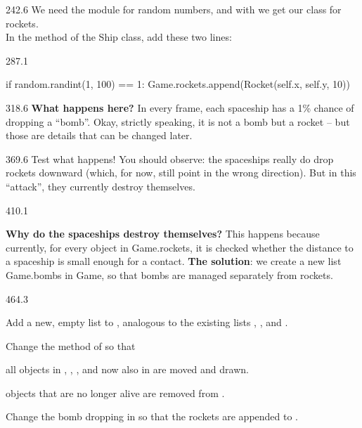 \documentclass{aslab}
\begin{document}
\begin{region}[x=74.7,right=0,pitch=13.3]{242.6}
We need the module  for random numbers, and with 
we get our class for rockets.\\
In the  method of the Ship class, add these two lines:
\end{region}

\begin{region}[x=74.7,right=0,pitch=13.2]{287.1}
\begin{codeblock}
if random.randint(1, 100) == 1:
    Game.rockets.append(Rocket(self.x, self.y, 10))
\end{codeblock}
\end{region}

\begin{region}[x=74.7,right=0,pitch=13.4]{318.6}
\textbf{What happens here?} In every frame, each spaceship has a 1\% chance
of dropping a ``bomb''. Okay, strictly speaking, it is not a bomb but a
rocket -- but those are details that can be changed later. 
\end{region}

\begin{region}[x=74.7,right=0,pitch=13.2]{369.6}
Test what happens! You should observe: the spaceships really do drop rockets
downward (which, for now, still point in the wrong direction). But in this
``attack'', they currently destroy themselves.
\end{region}

\begin{region}[pitch=13.57]{410.1}
\begin{plaintasks}[start=2]
\item \textbf{Why do the spaceships destroy themselves?} This happens
  because currently, for every object in Game.rockets, it is checked whether
  the distance to a spaceship is small enough for a contact. \textbf{The
  solution}: we create a new list Game.bombs in Game, so that bombs are
  managed separately from rockets.
\end{plaintasks}
\end{region}

\begin{region}[x=74.7,right=0,pitch=13.5]{464.3}
\begin{steps}
\item Add a new, empty list  to , analogous to the
  existing lists , , and .
\item Change the  method of  so that
  \begin{dotlist}
  \item all objects in , ,
    , and now also in  are moved and
    drawn.
  \item objects that are no longer alive are removed from
    .
  \end{dotlist}
\item Change the bomb dropping in  so that the rockets are
  appended to .
\end{steps}
\end{region}
\end{document}
